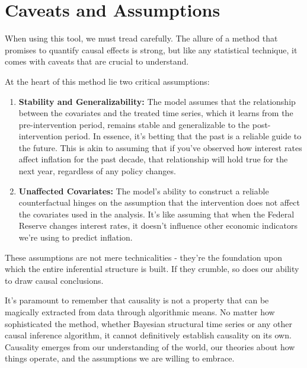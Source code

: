 \documentclass[
  letterpaper,
  DIV=11,
  numbers=noendperiod]{scrreprt}
\providecommand{\tightlist}{%
  \setlength{\itemsep}{0pt}\setlength{\parskip}{0pt}}\usepackage{longtable,booktabs,array}
\begin{document}
\section{Caveats and Assumptions}\label{caveats-and-assumptions}

When using this tool, we must tread carefully. The allure of a method
that promises to quantify causal effects is strong, but like any
statistical technique, it comes with caveats that are crucial to
understand.

At the heart of this method lie two critical assumptions:

\begin{enumerate}
\def\labelenumi{\arabic{enumi}.}
\tightlist
\item
  \textbf{Stability and Generalizability:} The model assumes that the
  relationship between the covariates and the treated time series, which
  it learns from the pre-intervention period, remains stable and
  generalizable to the post-intervention period. In essence, it's
  betting that the past is a reliable guide to the future. This is akin
  to assuming that if you've observed how interest rates affect
  inflation for the past decade, that relationship will hold true for
  the next year, regardless of any policy changes.
\item
  \textbf{Unaffected Covariates:} The model's ability to construct a
  reliable counterfactual hinges on the assumption that the intervention
  does not affect the covariates used in the analysis. It's like
  assuming that when the Federal Reserve changes interest rates, it
  doesn't influence other economic indicators we're using to predict
  inflation.
\end{enumerate}

These assumptions are not mere technicalities - they're the foundation
upon which the entire inferential structure is built. If they crumble,
so does our ability to draw causal conclusions.

\begin{tcolorbox}[enhanced jigsaw, colframe=quarto-callout-important-color-frame, left=2mm, toprule=.15mm, colbacktitle=quarto-callout-important-color!10!white, title=\textcolor{quarto-callout-important-color}{\faExclamation}\hspace{0.5em}{Important}, coltitle=black, rightrule=.15mm, leftrule=.75mm, colback=white, arc=.35mm, bottomtitle=1mm, bottomrule=.15mm, breakable, titlerule=0mm, opacitybacktitle=0.6, toptitle=1mm, opacityback=0]

It's paramount to remember that causality is not a property that can be
magically extracted from data through algorithmic means. No matter how
sophisticated the method, whether Bayesian structural time series or any
other causal inference algorithm, it cannot definitively establish
causality on its own. Causality emerges from our understanding of the
world, our theories about how things operate, and the assumptions we are
willing to embrace.

\end{tcolorbox}
\end{document}
